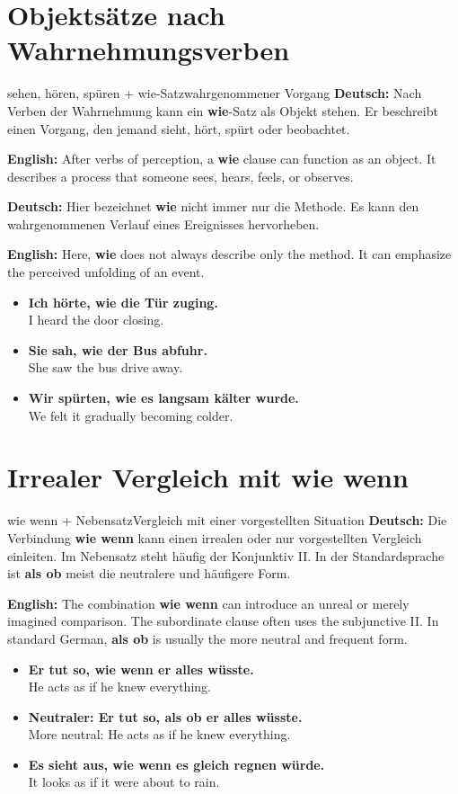 \documentclass[a4paper,11pt]{article}
\newcommand{\GermanText}[1]{\textbf{Deutsch: }#1\par}
\newcommand{\EnglishText}[1]{{\small\color{SoftGray}\textbf{English: }#1\par}}
\newcommand{\ExampleItem}[2]{\item \textbf{#1}\\{\small\color{SoftGray}#2}}
\begin{document}
\section{Objektsätze nach Wahrnehmungsverben}

\begin{grammarentry}{sehen, hören, spüren + wie-Satz}{wahrgenommener Vorgang}
\GermanText{Nach Verben der Wahrnehmung kann ein \textbf{wie}-Satz als Objekt stehen. Er beschreibt einen Vorgang, den jemand sieht, hört, spürt oder beobachtet.}
\EnglishText{After verbs of perception, a \textbf{wie} clause can function as an object. It describes a process that someone sees, hears, feels, or observes.}

\GermanText{Hier bezeichnet \textbf{wie} nicht immer nur die Methode. Es kann den wahrgenommenen Verlauf eines Ereignisses hervorheben.}
\EnglishText{Here, \textbf{wie} does not always describe only the method. It can emphasize the perceived unfolding of an event.}
\end{grammarentry}

\begin{exbox}
\begin{itemize}
\ExampleItem{Ich hörte, wie die Tür zuging.}{I heard the door closing.}
\ExampleItem{Sie sah, wie der Bus abfuhr.}{She saw the bus drive away.}
\ExampleItem{Wir spürten, wie es langsam kälter wurde.}{We felt it gradually becoming colder.}
\end{itemize}
\end{exbox}

\section{Irrealer Vergleich mit \glqq wie wenn\grqq}

\begin{grammarentry}{wie wenn + Nebensatz}{Vergleich mit einer vorgestellten Situation}
\GermanText{Die Verbindung \textbf{wie wenn} kann einen irrealen oder nur vorgestellten Vergleich einleiten. Im Nebensatz steht häufig der Konjunktiv II. In der Standardsprache ist \textbf{als ob} meist die neutralere und häufigere Form.}
\EnglishText{The combination \textbf{wie wenn} can introduce an unreal or merely imagined comparison. The subordinate clause often uses the subjunctive II. In standard German, \textbf{als ob} is usually the more neutral and frequent form.}
\end{grammarentry}

\begin{exbox}
\begin{itemize}
\ExampleItem{Er tut so, wie wenn er alles wüsste.}{He acts as if he knew everything.}
\ExampleItem{Neutraler: Er tut so, als ob er alles wüsste.}{More neutral: He acts as if he knew everything.}
\ExampleItem{Es sieht aus, wie wenn es gleich regnen würde.}{It looks as if it were about to rain.}
\end{itemize}
\end{exbox}
\end{document}
